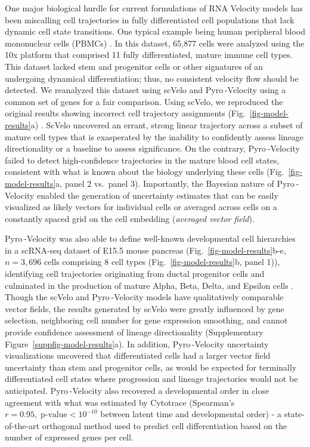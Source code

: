 \documentclass[
  sn-mathphys-num,
  lineno,
  twocolumn]{sn-jnl}
\begin{document}
One major biological hurdle for current formulations of RNA Velocity
models has been miscalling cell trajectories in fully differentiated
cell populations that lack dynamic cell state transitions. One typical
example being human peripheral blood mononuclear cells (PBMCs)
\citep{Zheng2017-bz}. In this dataset, 65,877 cells were analyzed using
the 10x platform that comprised 11 fully differentiated, mature immune
cell types. This dataset lacked stem and progenitor cells or other
signatures of an undergoing dynamical differentiation; thus, no
consistent velocity flow should be detected. We reanalyzed this dataset
using scVelo and Pyro -Velocity using a common set of genes for a fair
comparison. Using scVelo, we reproduced the original results showing
incorrect cell trajectory assignments (Fig.~\ref{fig-model-results}a)
\citep{Bergen2021-qz}. ScVelo uncovered an errant, strong linear
trajectory across a subset of mature cell types \citep{Zheng2017-bz}
that is exasperated by the inability to confidently assess lineage
directionality or a baseline to assess significance. On the contrary,
Pyro -Velocity failed to detect high-confidence trajectories in the
mature blood cell states, consistent with what is known about the
biology underlying these cells (Fig.~\ref{fig-model-results}a, panel 2
vs.~panel 3). Importantly, the Bayesian nature of Pyro -Velocity enabled
the generation of uncertainty estimates that can be easily visualized as
likely vectors for individual cells or averaged across cells on a
constantly spaced grid on the cell embedding (\emph{averaged vector
field}).

Pyro -Velocity was also able to define well-known developmental cell
hierarchies in a scRNA-seq dataset of E15.5 mouse pancreas
(Fig.~\ref{fig-model-results}b-e, \(n=3,696\) cells comprising \(8\)
cell types (Fig.~\ref{fig-model-results}b, panel 1)), identifying cell
trajectories originating from ductal progenitor cells and culminated in
the production of mature Alpha, Beta, Delta, and Epsilon cells
\citep{Bastidas-Ponce2019-lf}. Though the scVelo and Pyro -Velocity
models have qualitatively comparable vector fields, the results
generated by scVelo were greatly influenced by gene selection,
neighboring cell number for gene expression smoothing, and cannot
provide confidence assessment of lineage directionality
(Supplementary Figure~\ref{suppfig-model-results}a). In addition,
Pyro -Velocity uncertainty visualizations uncovered that differentiated
cells had a larger vector field uncertainty than stem and progenitor
cells, as would be expected for terminally differentiated cell states
where progression and lineage trajectories would not be anticipated.
Pyro -Velocity also recovered a developmental order in close agreement
with what was estimated by Cytotrace (Spearman's
\(r=0.95, \; \text{p-value} <
10^{-10}\) between latent time and developmental
order)\citep{Gulati2020-xq} - a state-of-the-art orthogonal method used
to predict cell differentiation based on the number of expressed genes
per cell.
\end{document}

